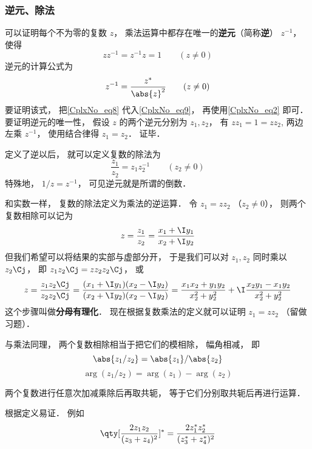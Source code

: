 \subsubsection{逆元、除法}
可以证明每个不为零的复数 $z$， 乘法运算中都存在唯一的\textbf{逆元}（简称\textbf{逆}） $z^{-1}$， 使得
\begin{equation}\label{CplxNo_eq9}
zz^{-1} = z^{-1}z = 1 \qquad (z \ne 0)
\end{equation}
逆元的计算公式为
\begin{equation}\label{CplxNo_eq8}
z^{-1} = \frac{z^*}{\abs{z}^2} \qquad (z \ne 0)
\end{equation}
要证明该式， 把\autoref{CplxNo_eq8} 代入\autoref{CplxNo_eq9}， 再使用\autoref{CplxNo_eq2} 即可． 要证明逆元的唯一性， 假设 $z$ 的两个逆元分别为 $z_1, z_2$， 有 $zz_1 = 1 = zz_2$, 两边左乘 $z^{-1}$， 使用结合律得 $z_1 = z_2$． 证毕．

定义了逆以后， 就可以定义复数的除法为
\begin{equation}
\frac{z_1}{z_2} = z_1z_2^{-1} \qquad (z_2 \ne 0)
\end{equation}
特殊地， $1/z = z^{-1}$， 可见逆元就是所谓的倒数．


和实数一样， 复数的除法定义为乘法的逆运算． 令 $z_1 = z z_2$ （$z_2 \ne 0$）， 则两个复数相除可以记为
\begin{equation}
z = \frac{z_1}{z_2} = \frac{x_1 + \I y_1}{x_2 + \I y_2}
\end{equation}
但我们希望可以将结果的实部与虚部分开， 于是我们可以对 $z_1, z_2$ 同时乘以 $z_2\Cj$， 即 $z_1 z_2\Cj  = z z_2 z_2\Cj$， 或
\begin{equation}\label{CplxNo_eq7}
z = \frac{z_1 z_2\Cj}{z_2 z_2\Cj}
= \frac{(x_1 + \I y_1)(x_2 - \I y_2)}{(x_2 + \I y_2)(x_2 - \I y_2)}
= \frac{x_1 x_2 + y_1 y_2}{x_2^2 + y_2^2} + \I \frac{x_2 y_1 - x_1 y_2}{x_2^2 + y_2^2}
\end{equation}
这个步骤叫做\textbf{分母有理化}． 现在根据复数乘法的定义就可以证明 $z_1 = z z_2$ （留做习题）．

与乘法同理， 两个复数相除相当于把它们的模相除， 幅角相减， 即
\begin{equation}
\abs{z_1/z_2} = \abs{z_1}/\abs{z_2}
\end{equation}
\begin{equation}
\arg(z_1/z_2) = \arg(z_1) - \arg(z_2)
\end{equation}

\begin{theorem}{}\label{CplxNo_the1}
两个复数进行任意次加减乘除后再取共轭， 等于它们分别取共轭后再进行运算．
\end{theorem}
根据定义易证． 例如
\begin{equation}
\qty[\frac{2 z_1 z_2}{(z_3 + z_4)^2}]^* = \frac{2 z_1^* z_2^*}{(z_3^* + z_4^*)^2}
\end{equation}

